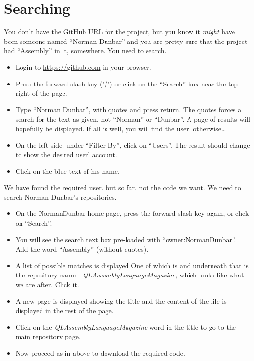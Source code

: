 \section{Searching}\label{sect: Searching}

You don't have the GitHub URL for the project, but you know it \emph{might} have been someone named ``Norman Dunbar'' and you are pretty sure that the project had ``Assembly'' in it, somewhere. You need to search.

\begin{itemize}
    \item Login to \url{https://github.com} in your browser.
    \item Press the forward-slash key ('/') or click on the ``Search'' box near the top-right of the page.
    \item Type ``Norman Dunbar'', with quotes and press return. The quotes forces a search for the text as given, not ``Norman'' or ``Dunbar''. A page of results will hopefully be displayed. If all is well, you will find the user, otherwise\ldots
    \item On the left side, under ``Filter By'', click on ``Users''. The result should change to show the desired user' account.
    \item Click on the blue text of his name.
\end{itemize}

We have found the required user, but so far, not the code we want. We need to search Norman Dunbar's repositories.

\begin{itemize}
    \item On the NormanDunbar home page, press the forward-slash key again, or click on ``Search''.
    \item You will see the search text box pre-loaded with ``owner:NormanDunbar''. Add the word ``Assembly'' (without quotes).
    \item A list of possible matches is displayed One of which is  and underneath that is the repository name---\emph{QLAssemblyLanguage\allowbreak{}Magazine}, which looks like what we are after. Click it.
    \item A new page is displayed showing the title  and the content of the file is displayed in the rest of the page.
    \item Click on the \emph{QLAssemblyLanguageMagazine} word in the title to go to the main repository page.
    \item Now proceed as in  above to download the required code.
\end{itemize}

